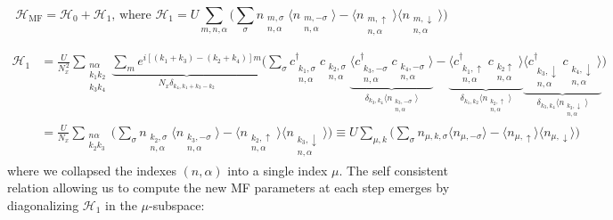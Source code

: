 \begin{equation}
\mathcal{H}_{\text{MF}} = \mathcal{H}_0 + \mathcal{H}_1 , \,\text{where} \,\, \mathcal{H}_1 = U \sum_{m, n, \alpha} \bigg( \sum_\sigma n_{\substack{m, \sigma \\ n, \alpha}} \big\langle n_{\substack{m, -\sigma \\ n, \alpha}} \big\rangle  - \big\langle n_{\substack{m, \uparrow \\ n, \alpha}} \big\rangle \big\langle n_{\substack{m, \downarrow \\ n, \alpha}} \big\rangle \bigg)
\end{equation}

\begin{equation}
\begin{split}
\mathcal{H}_1 &= \frac{U}{N_x^{\,2}} \sum_{\substack{n \alpha \\ k_1 k_2 \\ k_3 k_4}} \underbrace{\sum_m e^{i [ (k_1 + k_3) - (k_2 + k_4) ] m}}_{N_x \delta_{k_4, k_1 + k_3 - k_2}} \bigg( \sum_\sigma c_{\substack{k_1, \sigma \\ n, \alpha}}^\dagger c_{\substack{k_2, \sigma \\ n, \alpha}} \underbrace{\big\langle c_{\substack{k_3, -\sigma\\ n, \alpha}}^\dagger c_{\substack{k_4, -\sigma \\ n, \alpha}} \big\rangle}_{\delta_{k_3, k_4} \big\langle n_{\substack{k_3,-\sigma \\ n, \alpha}} \big\rangle} - \underbrace{\big\langle c_{\substack{k_1, \uparrow \\ n, \alpha}}^\dagger c_{\substack{k_2  \uparrow \\n, \alpha}} \big\rangle}_{\delta_{k_1, k_2} \big\langle n_{\substack{k_2,\uparrow \\ n, \alpha}} \big\rangle} \underbrace{\big\langle c_{\substack{k_3, \downarrow \\ n, \alpha}}^\dagger c_{\substack{k_4, \downarrow \\ n, \alpha}} \big\rangle}_{\delta_{k_3, k_4} \big\langle n_{\substack{k_3,\downarrow \\ n, \alpha}} \big\rangle}  \bigg) \\
&= \frac{U}{N_x} \sum_{\substack{n \alpha \\ k_2 k_3}} \bigg( \sum_\sigma n_{\substack{k_2, \sigma \\ n, \alpha}} \big\langle n_{\substack{k_3, -\sigma \\ n, \alpha}} \big\rangle - \big\langle n_{\substack{k_2, \uparrow \\ n, \alpha}} \big\rangle \big\langle n_{\substack{k_3, \downarrow \\ n, \alpha}} \big\rangle \bigg) \equiv
U \sum_{\mu,k} \bigg( \sum_\sigma n_{\mu, k,\sigma} \big\langle n_{\mu, -\sigma} \big\rangle - \big\langle n_{\mu, \uparrow} \big\rangle \big\langle n_{\mu, \downarrow} \big\rangle \bigg)
\end{split}
\end{equation}
where we collapsed the indexes $(n, \alpha)$ into a single index $\mu$.
The self consistent relation allowing us to compute the new MF parameters at each step emerges by diagonalizing $\mathcal{H}_1$ in the $\mu$-subspace:

